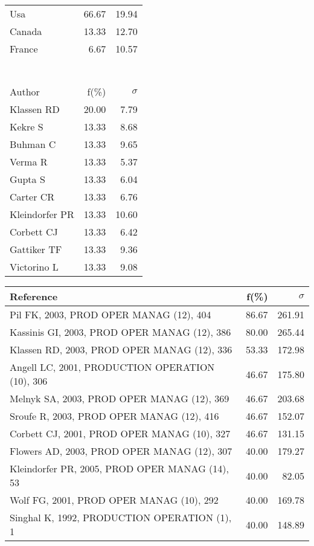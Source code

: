 \documentclass[a4paper,11pt]{report}
\begin{document}
\begin{landscape}
\begin{table}[!ht]
{\begin{tabular}{|l r r|}
Usa & 66.67 & 19.94\\
Canada & 13.33 & 12.70\\
France & 6.67 & 10.57\\
 &  & \\
 &  & \\
 &  & \\
 &  & \\
 &  & \\
 &  & \\
 &  & \\
\hline
\hline
Author & f(\%) & $\sigma$\\
\hline
Klassen RD & 20.00 & 7.79\\
Kekre S & 13.33 & 8.68\\
Buhman C & 13.33 & 9.65\\
Verma R & 13.33 & 5.37\\
Gupta S & 13.33 & 6.04\\
Carter CR & 13.33 & 6.76\\
Kleindorfer PR & 13.33 & 10.60\\
Corbett CJ & 13.33 & 6.42\\
Gattiker TF & 13.33 & 9.36\\
Victorino L & 13.33 & 9.08\\
\hline
\end{tabular}
}
{\scriptsize\begin{tabular}{|l r r|}
\hline
Reference & f(\%) & $\sigma$\\
\hline
Pil FK, 2003, PROD OPER MANAG (12), 404 & 86.67 & 261.91\\
Kassinis GI, 2003, PROD OPER MANAG (12), 386 & 80.00 & 265.44\\
Klassen RD, 2003, PROD OPER MANAG (12), 336 & 53.33 & 172.98\\
Angell LC, 2001, PRODUCTION OPERATION (10), 306 & 46.67 & 175.80\\
Melnyk SA, 2003, PROD OPER MANAG (12), 369 & 46.67 & 203.68\\
Sroufe R, 2003, PROD OPER MANAG (12), 416 & 46.67 & 152.07\\
Corbett CJ, 2001, PROD OPER MANAG (10), 327 & 46.67 & 131.15\\
Flowers AD, 2003, PROD OPER MANAG (12), 307 & 40.00 & 179.27\\
Kleindorfer PR, 2005, PROD OPER MANAG (14), 53 & 40.00 & 82.05\\
Wolf FG, 2001, PROD OPER MANAG (10), 292 & 40.00 & 169.78\\
Singhal K, 1992, PRODUCTION OPERATION (1), 1 & 40.00 & 148.89\\

\end{tabular}}
\end{table}
\end{landscape}
\end{document}
